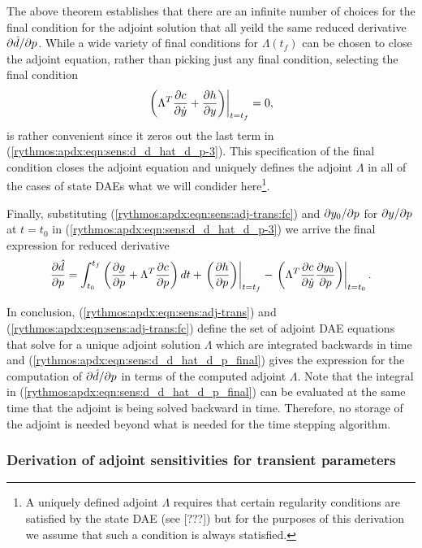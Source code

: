 \documentclass[pdf,ps2pdf,11pt]{SANDreport}
\begin{document}
The above theorem establishes that there are an infinite number of choices for
the final condition for the adjoint solution that all yeild the same reduced
derivative $\partial \hat{d} / \partial p$.  While a wide variety of final conditions for
$\Lambda(t_f)$ can be chosen to close the adjoint equation, rather than
picking just any final condition, selecting the final condition
%
\begin{equation}
\left. \left(
  \Lambda^T \displaystyle{\frac{\partial c}{\partial \dot{y}}}
  +  \displaystyle{\frac{\partial h}{\partial y}}
\right) \right|_{t=t_f}
 = 0,
\label{rythmos:apdx:eqn:sens:adj-trans:fc}
\end{equation}
%
is rather convenient since it zeros out the last term in
(\ref{rythmos:apdx:eqn:sens:d_d_hat_d_p-3}).  This specification of the final
condition closes the adjoint equation and uniquely defines the adjoint
$\Lambda$ in all of the cases of state DAEs what we will condider
here\footnote{A uniquely defined adjoint $\Lambda$ requires that certain
regularity conditions are satisfied by the state DAE (see [???]) but for the
purposes of this derivation we assume that such a condition is always
statisfied.}.  

Finally, substituting (\ref{rythmos:apdx:eqn:sens:adj-trans:fc}) and
$\partial y_0 / \partial p$ for $\partial y / \partial p$ at $t=t_0$ in
(\ref{rythmos:apdx:eqn:sens:d_d_hat_d_p-3}) we arrive the final expression for
reduced derivative
%
\begin{equation}
\displaystyle{\frac{\partial \hat{d}}{\partial p}} =
\int_{t_0}^{t_f} \left(
    \displaystyle{\frac{\partial g}{\partial p}}
    + \Lambda^T \displaystyle{\frac{\partial c}{\partial p}}
  \right) dt
  + \left. \left( \displaystyle{\frac{\partial h}{\partial p}} \right) \right|_{t=t_f}
  - \left. \left( \Lambda^T \displaystyle{\frac{\partial c}{\partial \dot{y}}} \displaystyle{\frac{\partial y_0}{\partial p}} \right) \right|_{t=t_0}.
\label{rythmos:apdx:eqn:sens:d_d_hat_d_p_final}
\end{equation}

In conclusion, (\ref{rythmos:apdx:eqn:sens:adj-trans}) and
(\ref{rythmos:apdx:eqn:sens:adj-trans:fc}) define the set of adjoint DAE
equations that solve for a unique adjoint solution $\Lambda$ which are
integrated backwards in time and
(\ref{rythmos:apdx:eqn:sens:d_d_hat_d_p_final}) gives the expression for the
computation of $\partial \hat{d} / \partial p$ in terms of the computed adjoint $\Lambda$.
Note that the integral in (\ref{rythmos:apdx:eqn:sens:d_d_hat_d_p_final}) can
be evaluated at the same time that the adjoint is being solved backward in
time.  Therefore, no storage of the adjoint is needed beyond what is needed
for the time stepping algorithm.

\subsubsection{Derivation of adjoint sensitivities for transient parameters}
\end{document}
